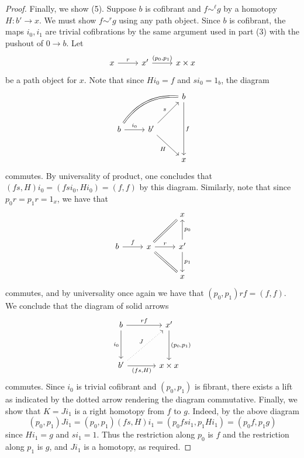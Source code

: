 \begin{proof}
	Finally, we show (5). Suppose $b$ is cofibrant and $f\sim ^\ell g$ by a homotopy $H : b' \to x$. We must show $f\sim ^rg$ using any path object. Since $b$ is cofibrant, the maps $i_0,i_1$ are trivial cofibrations by the same argument used in part (3) with the pushout of $0\to b$. Let
	\[\begin{tikzcd}[row sep = 2.5em, column sep = 2.5em]
	x \ar[" r ", r]  & x' \ar[" (p_0\text{,} p_1) ", r]  & x\times x
	\end{tikzcd}\]
	be a path object for $x$. Note that since $Hi_0=f$ and $si_0=1_b$, the diagram
	\[\begin{tikzcd}[row sep = 2.5em, column sep = 2.5em]
	 &  & b \ar[" f ", dd]  \\
	b \ar[equals, bend left, urr] \ar[" i_0 ", r]  & b' \ar[" s ", ur] \ar[" H "', dr]  &  \\
	 &  & x
	\end{tikzcd}\]
	commutes. By universality of product, one concludes that $(fs,H)i_0=(fsi_0,Hi_0)=(f,f)$ by this diagram. Similarly, note that since $p_0r=p_1r=1_x$, we have that
	\[\begin{tikzcd}[row sep = 2.5em, column sep = 2.5em]
	 &  & x \\
	b \ar[" f ", r]  & x \ar[equals, ur] \ar[equals, dr] \ar[" r ", r]  & x' \ar[" p_0 "', u] \ar[" p_1 ", d]  \\
	 &  & x
	\end{tikzcd}\]
	commutes, and by universality once again we have that $(p_0,p_1)rf=(f,f)$. We conclude that the diagram of solid arrows
	\[\begin{tikzcd}[row sep = 3.5em, column sep = 3.5em]
	b \ar[" rf ", r] \ar[" i_0 "', d]  & x' \ar[" (p_0 \text{,} p_1) ", d]  \\
	b' \ar[" (fs\text{,} H) "', r] \ar[" J ", dotted, ur] & x\times x
	\end{tikzcd}\]
	commutes. Since $i_0$ is trivial cofibrant and $(p_0,p_1)$ is fibrant, there exists a lift as indicated by the dotted arrow rendering the diagram commutative. Finally, we show that $K=Ji_1$ is a right homotopy from $f$ to $g$. Indeed, by the above diagram
	\[
		(p_0,p_1)Ji_1=(p_0,p_1)(fs,H)i_1=(p_0fsi_1,p_1Hi_1)=(p_0f,p_1g)
	\]
	since $Hi_1=g$ and $si_1=1$. Thus the restriction along $p_0$ is $f$ and the restriction along $p_1$ is $g$, and $Ji_1$ is a homotopy, as required.
\end{proof}

